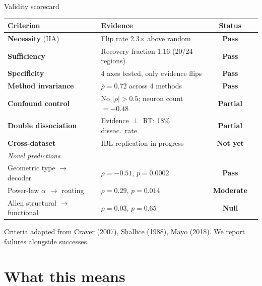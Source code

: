 \documentclass[aspectratio=169,11pt]{beamer}
\begin{document}
\begin{frame}{Validity scorecard}
{\small
\begin{tabular}{llcl}
\toprule
\textbf{Criterion} & \textbf{Evidence} & \textbf{Status} \\
\midrule
\textbf{Necessity} (IIA) & Flip rate 2.3$\times$ above random & \textcolor{pass}{\textbf{Pass}} \\
\textbf{Sufficiency} & Recovery fraction 1.16 (20/24 regions) & \textcolor{pass}{\textbf{Pass}} \\
\textbf{Specificity} & 4 axes tested, only evidence flips & \textcolor{pass}{\textbf{Pass}} \\
\textbf{Method invariance} & $\bar{\rho} = 0.72$ across 4 methods & \textcolor{pass}{\textbf{Pass}} \\
\textbf{Confound control} & No $|\rho| > 0.5$; neuron count $= -0.48$ & \textcolor{partial}{\textbf{Partial}} \\
\textbf{Double dissociation} & Evidence $\perp$ RT: 18\% dissoc.\ rate & \textcolor{partial}{\textbf{Partial}} \\
\textbf{Cross-dataset} & IBL replication in progress & \textcolor{fail}{\textbf{Not yet}} \\
\midrule
\multicolumn{3}{l}{\textit{Novel predictions}} \\
Geometric type $\to$ decoder & $\rho = -0.51$, $p = 0.0002$ & \textcolor{pass}{\textbf{Pass}} \\
Power-law $\alpha$ $\to$ routing & $\rho = 0.29$, $p = 0.014$ & \textcolor{partial}{\textbf{Moderate}} \\
Allen structural $\to$ functional & $\rho = 0.03$, $p = 0.65$ & \textcolor{fail}{\textbf{Null}} \\
\bottomrule
\end{tabular}
}

\vspace{0.6em}
{\small Criteria adapted from Craver (2007), Shallice (1988), Mayo (2018). We report failures alongside successes.}
\end{frame}

\section{What this means}

\end{document}
